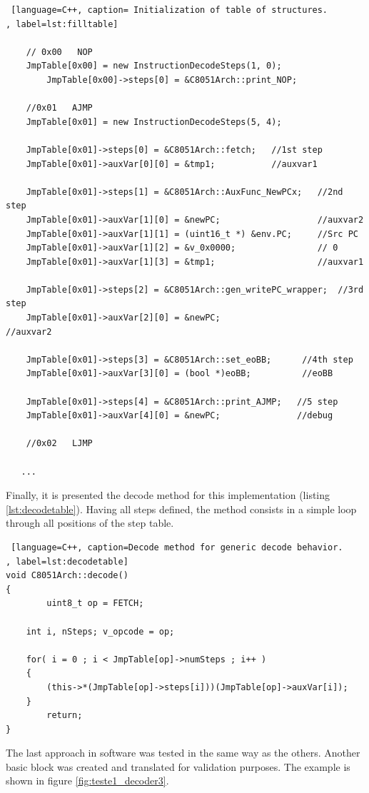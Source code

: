 \documentclass[12pt]{article}
\newcounter{subsubsubsection}[subsubsection]
\begin{document}
{\begin{lstlisting} [language=C++, caption= Initialization of table of structures.
, label=lst:filltable]
	
	// 0x00   NOP
	JmpTable[0x00] = new InstructionDecodeSteps(1, 0);
        JmpTable[0x00]->steps[0] = &C8051Arch::print_NOP;

	//0x01   AJMP
	JmpTable[0x01] = new InstructionDecodeSteps(5, 4);

	JmpTable[0x01]->steps[0] = &C8051Arch::fetch;   //1st step
	JmpTable[0x01]->auxVar[0][0] = &tmp1;           //auxvar1

	JmpTable[0x01]->steps[1] = &C8051Arch::AuxFunc_NewPCx;   //2nd step
	JmpTable[0x01]->auxVar[1][0] = &newPC;                   //auxvar2
	JmpTable[0x01]->auxVar[1][1] = (uint16_t *) &env.PC;     //Src PC
	JmpTable[0x01]->auxVar[1][2] = &v_0x0000;                // 0 
	JmpTable[0x01]->auxVar[1][3] = &tmp1;                    //auxvar1

	JmpTable[0x01]->steps[2] = &C8051Arch::gen_writePC_wrapper;  //3rd step
	JmpTable[0x01]->auxVar[2][0] = &newPC;                    //auxvar2

	JmpTable[0x01]->steps[3] = &C8051Arch::set_eoBB;      //4th step
	JmpTable[0x01]->auxVar[3][0] = (bool *)eoBB;          //eoBB
        
	JmpTable[0x01]->steps[4] = &C8051Arch::print_AJMP;   //5 step
	JmpTable[0x01]->auxVar[4][0] = &newPC;               //debug

	//0x02   LJMP
	
   ...
\end{lstlisting}

Finally, it is presented the decode method for this implementation (listing \ref{lst:decodetable}). Having all steps defined, the method consists in a simple loop through all positions of the step table. 

\begin{lstlisting} [language=C++, caption=Decode method for generic decode behavior.
, label=lst:decodetable]
void C8051Arch::decode()
{
		uint8_t op = FETCH;

    int i, nSteps; v_opcode = op;

    for( i = 0 ; i < JmpTable[op]->numSteps ; i++ )
    {
    	(this->*(JmpTable[op]->steps[i]))(JmpTable[op]->auxVar[i]);
    }      
		return;
}
\end{lstlisting}

\newpage
{}
The last approach in software was tested in the same way as the others. Another basic block was created and translated for validation purposes. The example is shown in figure \ref{fig:teste1_decoder3}.


}
\end{document}
